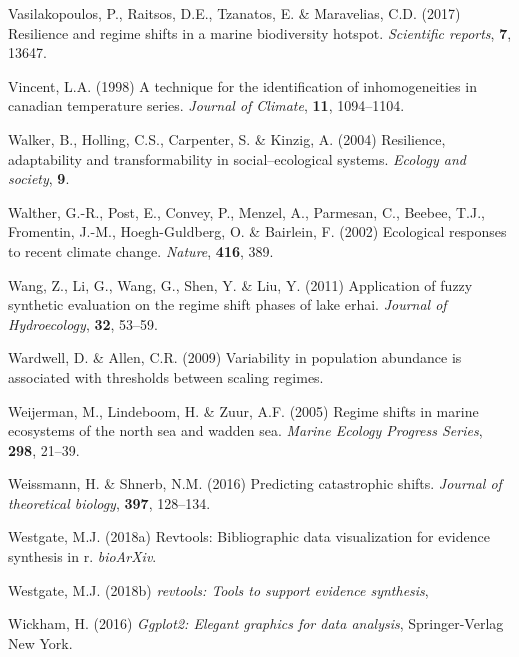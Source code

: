 \documentclass[12pt,twoside,openany]{reedthesis}
\begin{document}
\leavevmode\hypertarget{ref-vasilakopoulos2017resilience}{}%
Vasilakopoulos, P., Raitsos, D.E., Tzanatos, E. \& Maravelias, C.D. (2017) Resilience and regime shifts in a marine biodiversity hotspot. \emph{Scientific reports}, \textbf{7}, 13647.

\leavevmode\hypertarget{ref-vincent1998technique}{}%
Vincent, L.A. (1998) A technique for the identification of inhomogeneities in canadian temperature series. \emph{Journal of Climate}, \textbf{11}, 1094--1104.

\leavevmode\hypertarget{ref-walker2004resilience}{}%
Walker, B., Holling, C.S., Carpenter, S. \& Kinzig, A. (2004) Resilience, adaptability and transformability in social--ecological systems. \emph{Ecology and society}, \textbf{9}.

\leavevmode\hypertarget{ref-walther_ecological_2002}{}%
Walther, G.-R., Post, E., Convey, P., Menzel, A., Parmesan, C., Beebee, T.J., Fromentin, J.-M., Hoegh-Guldberg, O. \& Bairlein, F. (2002) Ecological responses to recent climate change. \emph{Nature}, \textbf{416}, 389.

\leavevmode\hypertarget{ref-wang2011application}{}%
Wang, Z., Li, G., Wang, G., Shen, Y. \& Liu, Y. (2011) Application of fuzzy synthetic evaluation on the regime shift phases of lake erhai. \emph{Journal of Hydroecology}, \textbf{32}, 53--59.

\leavevmode\hypertarget{ref-wardwell2009variability}{}%
Wardwell, D. \& Allen, C.R. (2009) Variability in population abundance is associated with thresholds between scaling regimes.

\leavevmode\hypertarget{ref-weijerman2005regime}{}%
Weijerman, M., Lindeboom, H. \& Zuur, A.F. (2005) Regime shifts in marine ecosystems of the north sea and wadden sea. \emph{Marine Ecology Progress Series}, \textbf{298}, 21--39.

\leavevmode\hypertarget{ref-weissmann2016predicting}{}%
Weissmann, H. \& Shnerb, N.M. (2016) Predicting catastrophic shifts. \emph{Journal of theoretical biology}, \textbf{397}, 128--134.

\leavevmode\hypertarget{ref-revtools2}{}%
Westgate, M.J. (2018a) Revtools: Bibliographic data visualization for evidence synthesis in r. \emph{bioArXiv}.

\leavevmode\hypertarget{ref-revtools}{}%
Westgate, M.J. (2018b) \emph{revtools: Tools to support evidence synthesis},

\leavevmode\hypertarget{ref-ggplot2}{}%
Wickham, H. (2016) \emph{Ggplot2: Elegant graphics for data analysis}, Springer-Verlag New York.
\end{document}
